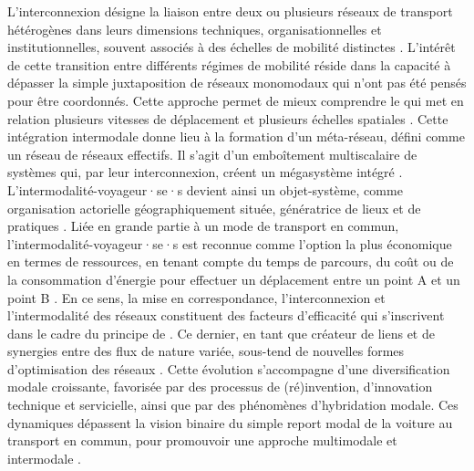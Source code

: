 \begin{refsegment}
L’interconnexion désigne la liaison entre deux ou plusieurs réseaux de transport hétérogènes dans leurs dimensions techniques, organisationnelles et institutionnelles, souvent associés à des échelles de mobilité distinctes \textcolor{blue}{\autocites[]{dupuy_reseaux_1988}{varlet_interconnexion_1992}}. L’intérêt de cette transition entre différents régimes de mobilité réside dans la capacité à dépasser la simple juxtaposition de réseaux monomodaux qui n'ont pas été pensés pour être coordonnés. Cette approche permet de mieux comprendre le  qui met en relation plusieurs vitesses de déplacement et plusieurs échelles spatiales \textcolor{blue}{\autocite[156]{peters_time_1960}}. Cette intégration intermodale donne lieu à la formation d’un méta-réseau, défini comme un réseau de réseaux effectifs. Il s’agit d’un emboîtement multiscalaire de systèmes qui, par leur interconnexion, créent un mégasystème intégré \textcolor{blue}{\autocite[89]{ageron_intermodalite-voyageurs_2013}}. L’intermodalité-voyageur·se·s devient ainsi un objet-système, comme organisation actorielle géographiquement située, génératrice de lieux et de pratiques \textcolor{blue}{\autocite[15]{varlet_interconnexion_1992}}. Liée en grande partie à un mode de transport en commun, l’intermodalité-voyageur·se·s est reconnue comme l’option la plus économique en termes de ressources, en tenant compte du temps de parcours, du coût ou de la consommation d’énergie pour effectuer un déplacement entre un point A et un point B \textcolor{blue}{\autocite[73]{oostendorp_combining_2018}}. En ce sens, la mise en correspondance, l’interconnexion et l’intermodalité des réseaux constituent des facteurs d’efficacité qui s’inscrivent dans le cadre du principe de . Ce dernier, en tant que créateur de liens et de synergies entre des flux de nature variée, sous-tend de nouvelles formes d’optimisation des réseaux \textcolor{blue}{\autocite[16-17]{amar_homo_2016}}. Cette évolution s’accompagne d’une diversification modale croissante, favorisée par des processus de (ré)invention, d’innovation technique et servicielle, ainsi que par des phénomènes d’hybridation modale. Ces dynamiques dépassent la vision binaire du simple report modal de la voiture au transport en commun, pour promouvoir une approche multimodale et intermodale \textcolor{blue}{\autocite{richer_dossier_2021}}.


\end{refsegment}
